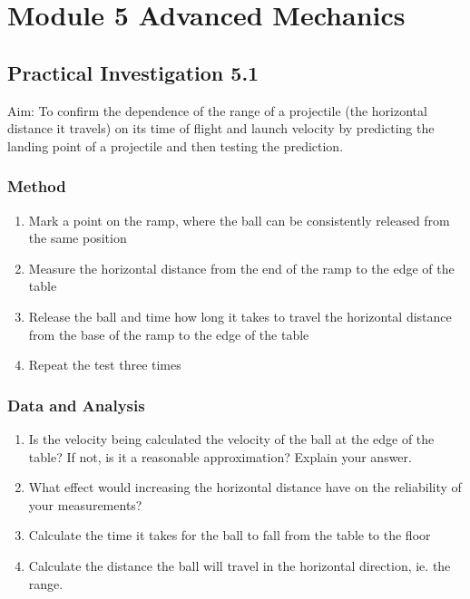 
\chapter{\Huge Module 5 \; Advanced Mechanics}

\section{Practical Investigation 5.1}
	Aim: To confirm the dependence of the range of a projectile (the horizontal distance it travels) on its time of flight and launch velocity by predicting the landing point of a projectile and then testing the prediction.

	\subsection{Method}
		\begin{enumerate}
			\item Mark a point on the ramp, where the ball can be consistently released from the same position
			\item Measure the horizontal distance from the end of the ramp to the edge of the table
			\item Release the ball and time how long it takes to travel the horizontal distance from the base of the ramp to the edge of the table
			\item Repeat the test three times
		\end{enumerate}

	\subsection{Data and Analysis}
		\begin{enumerate}
			\item Is the velocity being calculated the velocity of the ball at the edge of the table? If not, is it a reasonable approximation? Explain your answer.
			\item What effect would increasing the horizontal distance have on the reliability of your measurements?
			\item Calculate the time it takes for the ball to fall from the table to the floor
			\item Calculate the distance the ball will travel in the horizontal direction, ie. the range.
		\end{enumerate}

